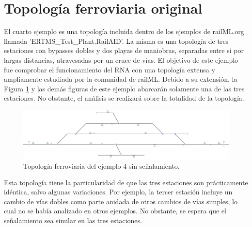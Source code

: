 \section{Topología ferroviaria original}
	
	El cuarto ejemplo es una topología incluida dentro de los ejemplos de railML.org llamada 'ERTMS\_Test\_Plant.RailAID'. La misma es una topología de tres estaciones con bypasses dobles y dos playas de maniobras, separadas entre si por largas distancias, atravesadas por un cruce de vías. El objetivo de este ejemplo fue comprobar el funcionamiento del RNA con una topología extensa y ampliamente estudiada por la comunidad de railML. Debido a su extensión, la Figura \ref{fig:EJ4_1} y las demás figuras de este ejemplo abarcarán solamente una de las tres estaciones. No obstante, el análisis se realizará sobre la totalidad de la topología.
	
	\begin{figure}[h]
		\centering
		\includegraphics[width=1\textwidth]{resultados-obtenidos/ejemplo4/images/4_empty.png}
		\centering\caption{Topología ferroviaria del ejemplo 4 sin señalamiento.}
		\label{fig:EJ4_1}
	\end{figure}
	
	Esta topología tiene la particularidad de que las tres estaciones son prácticamente idéntica, salvo algunas variaciones. Por ejemplo, la tercer estación incluye un cambio de vías dobles como parte anidada de otros cambios de vías simples, lo cual no se había analizado en otros ejemplos. No obstante, se espera que el señalamiento sea similar en las tres estaciones.
